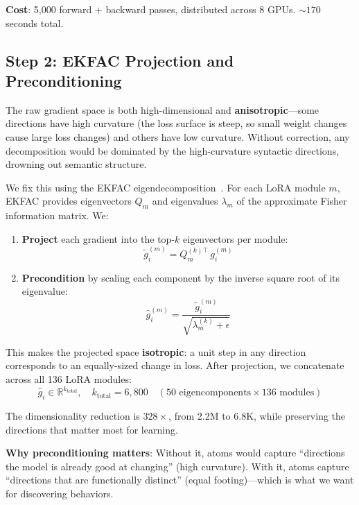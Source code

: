 \documentclass{article} %
\begin{document}
\textbf{Cost}: 5,000 forward + backward passes, distributed across 8 GPUs. ${\sim}170$ seconds total.

\subsection{Step 2: EKFAC Projection and Preconditioning}

The raw gradient space is both high-dimensional and \textbf{anisotropic}---some directions have high curvature (the loss surface is steep, so small weight changes cause large loss changes) and others have low curvature. Without correction, any decomposition would be dominated by the high-curvature syntactic directions, drowning out semantic structure.

We fix this using the EKFAC eigendecomposition~\citep{grosse2023studying, source}. For each LoRA module $m$, EKFAC provides eigenvectors $Q_m$ and eigenvalues $\lambda_m$ of the approximate Fisher information matrix. We:

\begin{enumerate}
\item \textbf{Project} each gradient into the top-$k$ eigenvectors per module:
\begin{equation}
\tilde{g}_i^{(m)} = Q_m^{(k)\top} \, g_i^{(m)}
\end{equation}

\item \textbf{Precondition} by scaling each component by the inverse square root of its eigenvalue:
\begin{equation}
\hat{g}_i^{(m)} = \frac{\tilde{g}_i^{(m)}}{\sqrt{\lambda_m^{(k)} + \epsilon}}
\end{equation}
\end{enumerate}

This makes the projected space \textbf{isotropic}: a unit step in any direction corresponds to an equally-sized change in loss. After projection, we concatenate across all 136 LoRA modules:
\begin{equation}
\hat{g}_i \in \mathbb{R}^{k_{\text{total}}}, \quad k_{\text{total}} = 6{,}800 \quad (50 \text{ eigencomponents} \times 136 \text{ modules})
\end{equation}

The dimensionality reduction is $328\times$, from 2.2M to 6.8K, while preserving the directions that matter most for learning.

\textbf{Why preconditioning matters}: Without it, atoms would capture ``directions the model is already good at changing'' (high curvature). With it, atoms capture ``directions that are functionally distinct'' (equal footing)---which is what we want for discovering behaviors.
\end{document}
